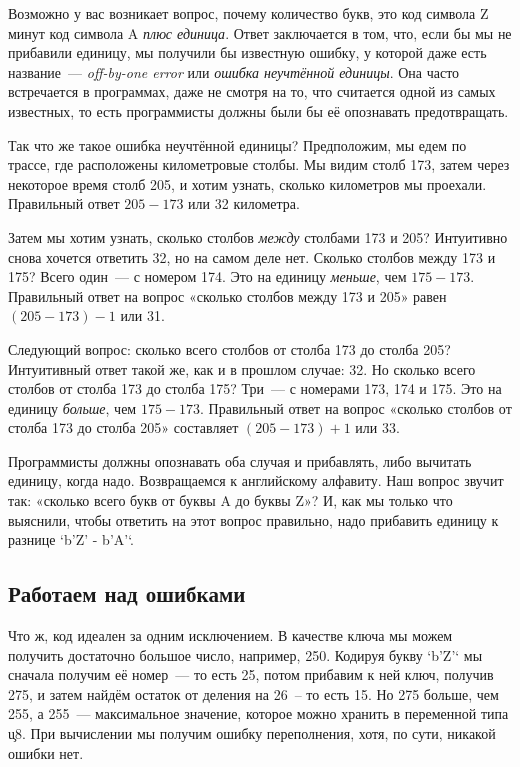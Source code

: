 Возможно у вас возникает вопрос, почему количество букв, это код символа Z минут код символа A {\em плюс единица}.
Ответ заключается в том, что, если бы мы не прибавили единицу, мы получили бы известную ошибку, у которой даже есть название~--- {\em off-by-one error} или {\em ошибка неучтённой единицы}.
Она часто встречается в программах, даже не смотря на то, что считается одной из самых известных, то есть программисты должны были бы её опознавать предотвращать.

Так что же такое ошибка неучтённой единицы?
Предположим, мы едем по трассе, где расположены километровые столбы.
Мы видим столб 173, затем через некоторое время столб 205, и хотим узнать, сколько километров мы проехали.
Правильный ответ $205 - 173$ или 32 километра.

Затем мы хотим узнать, сколько столбов {\em между} столбами 173 и 205?
Интуитивно снова хочется ответить 32, но на самом деле нет.
Сколько столбов между 173 и 175? Всего один~--- с номером 174.
Это на единицу {\em меньше}, чем $175 - 173$.
Правильный ответ на вопрос «сколько столбов между 173 и 205» равен $(205 - 173) - 1$ или 31.

Следующий вопрос: сколько всего столбов от столба 173 до столба 205?
Интуитивный ответ такой же, как и в прошлом случае: 32.
Но сколько всего столбов от столба 173 до столба 175? Три~--- с номерами 173, 174 и 175.
Это на единицу {\em больше}, чем $175 - 173$.
Правильный ответ на вопрос «сколько столбов от столба 173 до столба 205» составляет $(205 - 173) + 1$ или 33.

Программисты должны опознавать оба случая и прибавлять, либо вычитать единицу, когда надо.
Возвращаемся к английскому алфавиту. Наш вопрос звучит так: «сколько всего букв от буквы A до буквы Z»?
И, как мы только что выяснили, чтобы ответить на этот вопрос правильно, надо прибавить единицу к разнице `b'Z' - b'A'`.

\subsection{Работаем над ошибками}

Что ж, код идеален за одним исключением. В качестве ключа мы можем получить достаточно большое число, например, 250.
Кодируя букву `b'Z'` мы сначала получим её номер~--- то есть 25, потом прибавим к ней ключ, получив 275, и затем найдём остаток от деления на 26~-- то есть 15.
Но 275 больше, чем 255, а 255~--- максимальное значение, которое можно хранить в переменной типа \c{u8}.
При вычислении мы получим ошибку переполнения, хотя, по сути, никакой ошибки нет.

